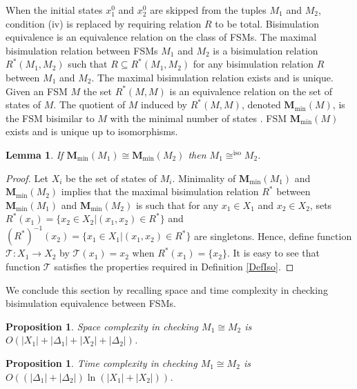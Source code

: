 \documentclass{amsart}
\newtheorem{lemma}[theorem]{Lemma}
\newtheorem{proposition}[theorem]{Proposition}
\theoremstyle{definition}
\theoremstyle{remark}
\numberwithin{equation}{section}
\newcommand{\iso}{\mathrm{iso}}
\begin{document}
When the initial states $x^{0}_{1}$ and $x^{0}_{2}$ are skipped from the tuples $M_{1}$ and $M_{2}$, condition (iv) is replaced by requiring relation $R$ to be total. 
Bisimulation equivalence is an equivalence relation on the class of FSMs. 
The maximal bisimulation relation between FSMs $M_{1}$ and $M_{2}$ is a bisimulation relation $R^{\ast}(M_{1},M_{2})$ such that $R\subseteq R^{\ast}(M_{1},M_{2})$ for any bisimulation relation $R$ between $M_{1}$ and $M_{2}$. The maximal bisimulation relation exists and is unique. Given an  FSM $M$ the set $R^{\ast}(M,M)$ is an equivalence relation on the set of states of $M$. 
The quotient of $M$ induced by $R^{\ast}(M,M)$, denoted $\mathbf{M}_{\min}(M)$, is the FSM bisimilar to $M$ with the minimal number of states \cite{ModelChecking}. FSM $\mathbf{M}_{\min}(M)$ exists and is unique up to isomorphisms.
\begin{lemma}
\label{lemma}
If $\mathbf{M}_{\min}(M_{1}) \cong \mathbf{M}_{\min}(M_{2})$ then $M_{1}\cong^{\iso} M_{2}$.
\end{lemma}
\begin{proof}
Let $X_{i}$ be the set of states of $M_{i}$. 
Minimality of $\mathbf{M}_{\min}(M_{1})$ and $\mathbf{M}_{\min}(M_{2})$ implies that the maximal bisimulation relation $R^{\ast}$ between $\mathbf{M}_{\min}(M_{1})$ and $\mathbf{M}_{\min}(M_{2})$ is such that for any $x_{1}\in X_{1}$ and $x_{2}\in X_{2}$, sets $R^{\ast}(x_{1})=\{x_{2}\in X_{2} | (x_{1},x_{2})\in R^{\ast}\}$ and $(R^{\ast})^{-1}(x_{2})=\{x_{1}\in X_{1} | (x_{1},x_{2})\in R^{\ast}\}$ are singletons. Hence, define function $\mathcal{T}: X_{1}\rightarrow X_{2}$ by $\mathcal{T}(x_{1})=x_{2}$ when $R^{\ast}(x_{1})=\{x_{2}\}$. It is easy to see that function $\mathcal{T}$ satisfies the properties required in Definition \ref{DefIso}.
\end{proof}

We conclude this section by recalling space and time complexity in checking bisimulation equivalence between FSMs. 
\begin{proposition}
\label{prop21}
\cite{BisAlg}
Space complexity in checking $M_{1}\cong M_{2}$ is $O(|X_{1}|+|\Delta_{1}|+|X_{2}|+|\Delta_{2}|)$.
\end{proposition}

\begin{proposition}
\label{prop22}
\cite{BisAlg}
Time complexity in checking $M_{1}\cong M_{2}$ is $O((|\Delta_{1}|+|\Delta_{2}|)\ln(|X_{1}|+|X_{2}|))$. 
\end{proposition}
\end{document}
